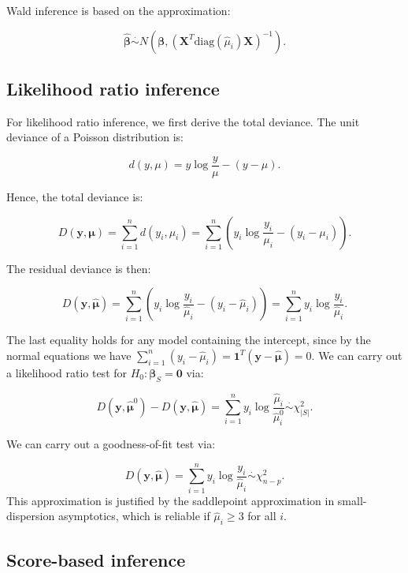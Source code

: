 \documentclass[
  11pt,
  letterpaper,
  oneside]{book}
\theoremstyle{plain}
\theoremstyle{plain}
\theoremstyle{definition}
\theoremstyle{definition}
\theoremstyle{plain}
\theoremstyle{remark}
\begin{document}
Wald inference is based on the approximation:

\[
\boldsymbol{\hat \beta} \overset \cdot \sim N(\boldsymbol{\beta}, (\boldsymbol{X}^T \text{diag}(\hat \mu_i)\boldsymbol{X})^{-1}).
\]

\hypertarget{sec-likelihood-ratio-inference}{%
\subsection{Likelihood ratio
inference}\label{sec-likelihood-ratio-inference}}

For likelihood ratio inference, we first derive the total deviance. The
unit deviance of a Poisson distribution is:

\[
d(y, \mu) = y \log \frac{y}{\mu} - (y - \mu).
\]

Hence, the total deviance is:

\[
D(\boldsymbol{y}, \boldsymbol{\mu}) = \sum_{i = 1}^n d(y_i, \mu_i) = \sum_{i = 1}^n \left(y_i \log \frac{y_i}{\mu_i} - (y_i - \mu_i)\right).
\]

The residual deviance is then:

\[
D(\boldsymbol{y}, \boldsymbol{\hat\mu}) = \sum_{i = 1}^n \left(y_i \log \frac{y_i}{\hat \mu_i} - (y_i - \hat \mu_i)\right) = \sum_{i = 1}^n y_i \log \frac{y_i}{\hat \mu_i}.
\]

The last equality holds for any model containing the intercept, since by
the normal equations we have
\(\sum_{i = 1}^n (y_i - \hat \mu_i) = \boldsymbol{1}^T (\boldsymbol{y} - \boldsymbol{\hat \mu}) = 0\).
We can carry out a likelihood ratio test for
\(H_0: \boldsymbol \beta_S = \boldsymbol{0}\) via:

\[
D(\boldsymbol{y}, \boldsymbol{\hat \mu}^0) - D(\boldsymbol{y}, \boldsymbol{\hat \mu}) = \sum_{i = 1}^n y_i \log \frac{\hat \mu_i}{\hat \mu^0_{i}} \overset{\cdot}\sim \chi^2_{|S|}.
\]

We can carry out a goodness-of-fit test via:

\[
D(\boldsymbol{y}, \boldsymbol{\hat\mu}) = \sum_{i = 1}^n y_i \log \frac{y_i}{\hat \mu_i} \overset{\cdot}\sim \chi^2_{n - p}.
\] This approximation is justified by the saddlepoint approximation in
small-dispersion asymptotics, which is reliable if \(\hat \mu_i \geq 3\)
for all \(i\).

\hypertarget{sec-score-based-inference}{%
\subsection{Score-based inference}\label{sec-score-based-inference}}
\end{document}

